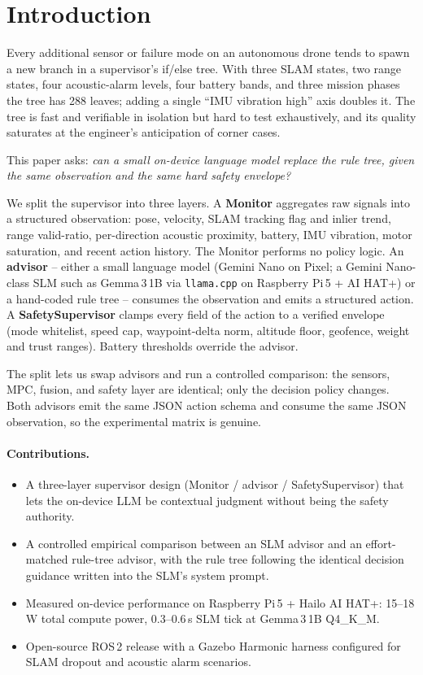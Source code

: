 \section{Introduction}
\label{sec:intro}

Every additional sensor or failure mode on an autonomous drone tends
to spawn a new branch in a supervisor's if/else tree. With three SLAM
states, two range states, four acoustic-alarm levels, four battery
bands, and three mission phases the tree has 288 leaves; adding a
single ``IMU vibration high'' axis doubles it. The tree is fast and
verifiable in isolation but hard to test exhaustively, and its
quality saturates at the engineer's anticipation of corner cases.

This paper asks: \emph{can a small on-device language model replace
the rule tree, given the same observation and the same hard safety
envelope?}

We split the supervisor into three layers. A \textbf{Monitor}
aggregates raw signals into a structured observation: pose, velocity,
SLAM tracking flag and inlier trend, range valid-ratio, per-direction
acoustic proximity, battery, IMU vibration, motor saturation, and
recent action history. The Monitor performs no policy logic. An
\textbf{advisor} -- either a small language model (Gemini Nano on
Pixel; a Gemini Nano-class SLM such as Gemma\,3\,1B via
\texttt{llama.cpp} on Raspberry Pi\,5 + AI HAT+) or a hand-coded
rule tree -- consumes the observation and emits a structured action.
A \textbf{SafetySupervisor} clamps every field of the action to a
verified envelope (mode whitelist, speed cap, waypoint-delta norm,
altitude floor, geofence, weight and trust ranges). Battery
thresholds override the advisor.

The split lets us swap advisors and run a controlled comparison: the
sensors, MPC, fusion, and safety layer are identical; only the
decision policy changes. Both advisors emit the same JSON action
schema and consume the same JSON observation, so the experimental
matrix is genuine.

\paragraph{Contributions.}
\begin{itemize}
\item A three-layer supervisor design (Monitor / advisor /
  SafetySupervisor) that lets the on-device LLM be contextual
  judgment without being the safety authority.
\item A controlled empirical comparison between an SLM advisor and
  an effort-matched rule-tree advisor, with the rule tree following
  the identical decision guidance written into the SLM's system
  prompt.
\item Measured on-device performance on Raspberry Pi\,5 + Hailo
  AI HAT+: 15--18\,W total compute power, 0.3--0.6\,s SLM tick at
  Gemma\,3\,1B Q4\_K\_M.
\item Open-source ROS\,2 release with a Gazebo Harmonic harness
  configured for SLAM dropout and acoustic alarm scenarios.
\end{itemize}

